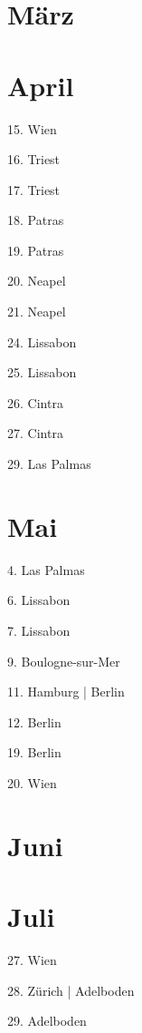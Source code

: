 \documentclass[twoside=false,titlepage=false,open=any, parskip=never, fontsize=10pt, headings=small, chapterprefix=false, appendixprefix=false, DIV=15]{scrbook}
\begin{document}
\begin{multicols}{3}
            \section*{März}
            \section*{April}
            15. Wien\par
            16. Triest\par
            17. Triest\par
            18. Patras\par
            19. Patras\par
            20. Neapel\par
            21. Neapel\par
            24. Lissabon\par
            25. Lissabon\par
            26. Cintra\par
            27. Cintra\par
            29. Las Palmas\par
            \section*{Mai}
            4. Las Palmas\par
            6. Lissabon\par
            7. Lissabon\par
            9. Boulogne-sur-Mer\par
            11. Hamburg | Berlin\par
            12. Berlin\par
            19. Berlin\par
            20. Wien\par
            \section*{Juni}
            \section*{Juli}
            27. Wien\par
            28. Zürich | Adelboden\par
            29. Adelboden\par

\end{multicols}
\end{document}
